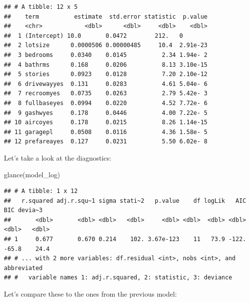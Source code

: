 \documentclass[
]{article}
\newenvironment{Shaded}{\begin{snugshade}}{\end{snugshade}}
\newcommand{\FunctionTok}[1]{\textcolor[rgb]{0.00,0.00,0.00}{#1}}
\newcommand{\NormalTok}[1]{#1}
\begin{document}
\begin{verbatim}
## # A tibble: 12 x 5
##    term          estimate  std.error statistic  p.value
##    <chr>            <dbl>      <dbl>     <dbl>    <dbl>
##  1 (Intercept) 10.0       0.0472        212.   0       
##  2 lotsize      0.0000506 0.00000485     10.4  2.91e-23
##  3 bedrooms     0.0340    0.0145          2.34 1.94e- 2
##  4 bathrms      0.168     0.0206          8.13 3.10e-15
##  5 stories      0.0923    0.0128          7.20 2.10e-12
##  6 drivewayyes  0.131     0.0283          4.61 5.04e- 6
##  7 recroomyes   0.0735    0.0263          2.79 5.42e- 3
##  8 fullbaseyes  0.0994    0.0220          4.52 7.72e- 6
##  9 gashwyes     0.178     0.0446          4.00 7.22e- 5
## 10 aircoyes     0.178     0.0215          8.26 1.14e-15
## 11 garagepl     0.0508    0.0116          4.36 1.58e- 5
## 12 prefareayes  0.127     0.0231          5.50 6.02e- 8
\end{verbatim}

Let's take a look at the diagnostics:

\begin{Shaded}
\begin{Highlighting}[]
\FunctionTok{glance}\NormalTok{(model\_log)}
\end{Highlighting}
\end{Shaded}

\begin{verbatim}
## # A tibble: 1 x 12
##   r.squared adj.r.squ~1 sigma stati~2   p.value    df logLik   AIC   BIC devia~3
##       <dbl>       <dbl> <dbl>   <dbl>     <dbl> <dbl>  <dbl> <dbl> <dbl>   <dbl>
## 1     0.677       0.670 0.214    102. 3.67e-123    11   73.9 -122. -65.8    24.4
## # ... with 2 more variables: df.residual <int>, nobs <int>, and abbreviated
## #   variable names 1: adj.r.squared, 2: statistic, 3: deviance
\end{verbatim}

Let's compare these to the ones from the previous model:
\end{document}
